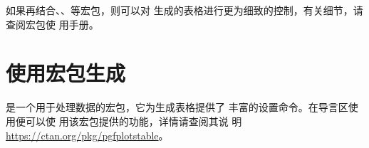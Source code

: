 \documentclass[scheme=chinese, heading = true, UTF8]{ctexart}
\begin{document}

  如果再结合、、等宏包，则可以对
  生成的表格进行更为细致的控制，有关细节，请查阅宏包使
  用手册。

  \section{使用宏包生成\ltab }
  是一个用于处理\csv 数据的宏包，它为生成表格提供了
  丰富的设置命令。在导言区使用\qtmark{\texinline{\usepackage{pgfplotstable}}}便可以使
  用该宏包提供的功能，详情请查阅其说
  明\url{https://ctan.org/pkg/pgfplotstable}。
\end{document}
